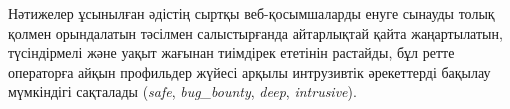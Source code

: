 \begin{SingleSpace}
Нәтижелер ұсынылған әдістің сыртқы веб-қосымшаларды енуге сынауды толық қолмен орындалатын тәсілмен салыстырғанда айтарлықтай қайта жаңартылатын, түсіндірмелі және уақыт жағынан тиімдірек ететінін растайды, бұл ретте операторға айқын профильдер жүйесі арқылы интрузивтік әрекеттерді бақылау мүмкіндігі сақталады (\textit{safe}, \textit{bug\_bounty}, \textit{deep}, \textit{intrusive}).

\par{}
\end{SingleSpace}
\clearpage
